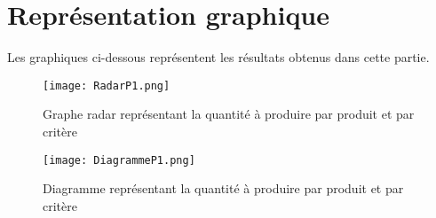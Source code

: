 \section{Représentation graphique}
Les graphiques ci-dessous représentent les résultats obtenus dans cette partie.
\begin{center}
\begin{figure}[!ht]
	\texttt{[image: RadarP1.png]}
	\caption{Graphe radar représentant la quantité à produire par produit et par critère}
\end{figure}

\begin{figure}[!ht]
	\texttt{[image: DiagrammeP1.png]}
	\caption{Diagramme représentant la quantité à produire par produit et par critère}
\end{figure}
\end{center}
